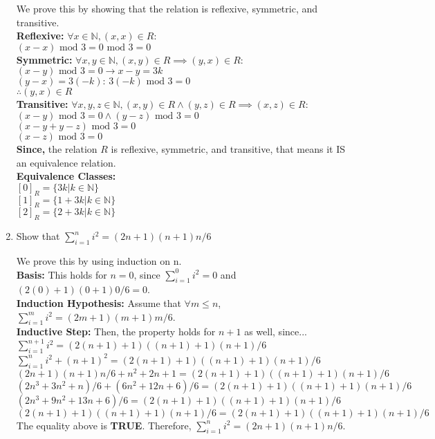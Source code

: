 \documentclass[12pt]{article}
\begin{document}
\begin{enumerate}
We prove this by showing that the relation is reflexive, symmetric, and transitive.\\
\textbf{Reflexive:} $\forall x \in \mathbb{N}, (x, x) \in R$:\\
$(x - x) \text{ mod } 3 = 0 \text{ mod } 3 = 0$\\
\textbf{Symmetric:} $\forall x, y \in \mathbb{N}, (x, y) \in R \implies (y, x) \in R$:\\
$(x - y) \text{ mod } 3 = 0 \rightarrow x - y = 3k$\\
$(y - x) = 3(-k) \text{: } 3(-k) \text{ mod } 3 = 0$\\
$\therefore (y, x) \in R$\\
\textbf{Transitive:} $\forall x, y, z \in \mathbb{N}, (x, y) \in R \wedge (y, z) \in R \implies (x, z) \in R$:\\
$(x - y) \text{ mod } 3 = 0 \wedge (y - z) \text{ mod } 3 = 0$\\
$(x - y + y - z) \text{ mod } 3 = 0$\\
$(x - z) \text{ mod } 3 = 0$\\
\textbf{Since,} the relation $R$ is reflexive, symmetric, and transitive, that means it IS an equivalence relation.\\
\textbf{Equivalence Classes:}\\
$[0]_R = \{3k | k \in \mathbb{N}\}$\\
$[1]_R = \{1 + 3k | k \in \mathbb{N}\}$\\
$[2]_R = \{2 + 3k | k \in \mathbb{N}\}$



\item Show that $\sum^{n}_{i=1} i^2 = (2n + 1)(n + 1)n/6$

We prove this by using induction on n.\\
\textbf{Basis:} This holds for $n = 0$, since $\sum^0_{i=1} i^2 = 0$ and $(2(0) + 1)(0 + 1)0/6 = 0$.\\
\textbf{Induction Hypothesis:} Assume that $\forall m \leq n$, $\sum^m_{i=1} i^2 = (2m + 1)(m + 1)m/6$.\\
\textbf{Inductive Step:} Then, the property holds for $n + 1$ as well, since...\\
$\sum^{n+1}_{i=1} i^2 = (2(n + 1) + 1)((n + 1) + 1)(n + 1)/6$\\
$\sum^n_{i=1} i^2 + (n + 1)^2 = (2(n + 1) + 1)((n + 1) + 1)(n + 1)/6$\\
$(2n + 1)(n + 1)n/6 + n^2 + 2n + 1 = (2(n + 1) + 1)((n + 1) + 1)(n + 1)/6$\\
$(2n^3 + 3n^2 + n)/6 + (6n^2 + 12n + 6)/6 = (2(n + 1) + 1)((n + 1) + 1)(n + 1)/6$\\
$(2n^3 + 9n^2 + 13n + 6)/6 = (2(n + 1) + 1)((n + 1) + 1)(n + 1)/6$\\
$(2(n + 1) + 1)((n + 1) + 1)(n + 1)/6 = (2(n + 1) + 1)((n + 1) + 1)(n + 1)/6$\\
The equality above is \textbf{TRUE}. Therefore, $\sum^{n}_{i=1} i^2 = (2n + 1)(n + 1)n/6$.


\end{enumerate}
\end{document}
